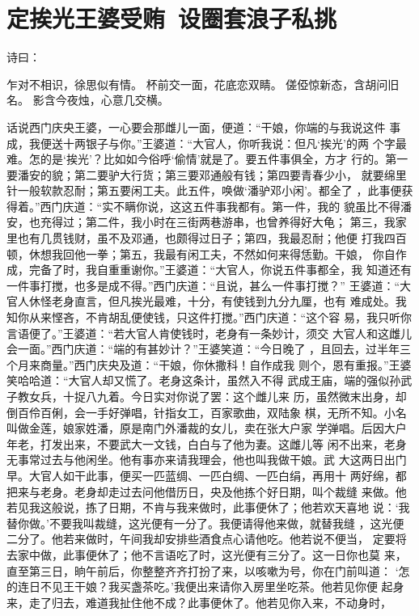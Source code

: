 \chapter{定挨光王婆受贿~设圈套浪子私挑}

诗曰：

乍对不相识，徐思似有情。
杯前交一面，花底恋双睛。
傞俹惊新态，含胡问旧名。
影含今夜烛，心意几交横。

话说西门庆央王婆，一心要会那雌儿一面，便道：“干娘，你端的与我说这件
事成，我便送十两银子与你。”王婆道：“大官人，你听我说：但凡‘挨光’的两
个字最难。怎的是‘挨光’？比如如今俗呼‘偷情’就是了。要五件事俱全，方才
行的。第一要潘安的貌；第二要驴大行货；第三要邓通般有钱；第四要青春少小，
就要绵里针一般软款忍耐；第五要闲工夫。此五件，唤做‘潘驴邓小闲’。都全了
，此事便获得着。”西门庆道：“实不瞒你说，这这五件事我都有。第一件，我的
貌虽比不得潘安，也充得过；第二件，我小时在三街两巷游串，也曾养得好大龟；
第三，我家里也有几贯钱财，虽不及邓通，也颇得过日子；第四，我最忍耐；他便
打我四百顿，休想我回他一拳；第五，我最有闲工夫，不然如何来得恁勤。干娘，
你自作成，完备了时，我自重重谢你。”王婆道：“大官人，你说五件事都全，我
知道还有一件事打搅，也多是成不得。”西门庆道：“且说，甚么一件事打搅？”
王婆道：“大官人休怪老身直言，但凡挨光最难，十分，有使钱到九分九厘，也有
难成处。我知你从来悭吝，不肯胡乱便使钱，只这件打搅。”西门庆道：“这个容
易，我只听你言语便了。”王婆道：“若大官人肯使钱时，老身有一条妙计，须交
大官人和这雌儿会一面。”西门庆道：“端的有甚妙计？”王婆笑道：“今日晚了
，且回去，过半年三个月来商量。”西门庆央及道：“干娘，你休撒科！自作成我
则个，恩有重报。”王婆笑哈哈道：“大官人却又慌了。老身这条计，虽然入不得
武成王庙，端的强似孙武子教女兵，十捉八九着。今日实对你说了罢：这个雌儿来
历，虽然微末出身，却倒百伶百俐，会一手好弹唱，针指女工，百家歌曲，双陆象
棋，无所不知。小名叫做金莲，娘家姓潘，原是南门外潘裁的女儿，卖在张大户家
学弹唱。后因大户年老，打发出来，不要武大一文钱，白白与了他为妻。这雌儿等
闲不出来，老身无事常过去与他闲坐。他有事亦来请我理会，他也叫我做干娘。武
大这两日出门早。大官人如干此事，便买一匹蓝绸、一匹白绸、一匹白绢，再用十
两好绵，都把来与老身。老身却走过去问他借历日，央及他拣个好日期，叫个裁缝
来做。他若见我这般说，拣了日期，不肯与我来做时，此事便休了；他若欢天喜地
说：‘我替你做。’不要我叫裁缝，这光便有一分了。我便请得他来做，就替我缝
，这光便二分了。他若来做时，午间我却安排些酒食点心请他吃。他若说不便当，
定要将去家中做，此事便休了；他不言语吃了时，这光便有三分了。这一日你也莫
来，直至第三日，晌午前后，你整整齐齐打扮了来，以咳嗽为号，你在门前叫道：
‘怎的连日不见王干娘？我买盏茶吃。’我便出来请你入房里坐吃茶。他若见你便
起身来，走了归去，难道我扯住他不成？此事便休了。他若见你入来，不动身时，
